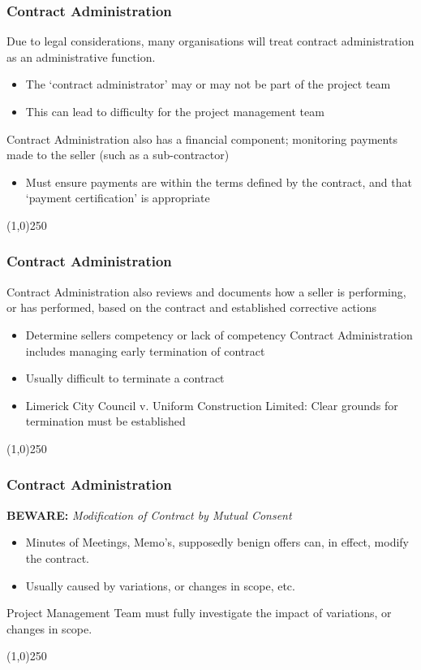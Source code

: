 \begin{frame}
\frametitle{Contract Administration}
Due to legal considerations, many organisations will treat contract administration as an administrative function.\\
\begin{itemize}
	\item The `contract administrator' may or may not be part of the project team
	\item This can lead to difficulty for the project management team
\end{itemize}
Contract Administration also has a financial component; monitoring payments made to the seller (such as a sub-contractor)
\begin{itemize}
	\item Must ensure payments are within the terms defined by the contract, and that `payment certification' is appropriate
\end{itemize}
\end{frame}\begin{center}\line(1,0){250}\end{center}



\begin{frame}
\frametitle{Contract Administration}
Contract Administration also reviews and documents how a seller is performing, or has performed, based on the contract and established corrective actions
\begin{itemize}
	\item Determine sellers competency or lack of competency
Contract Administration includes managing early termination of contract
	\item Usually difficult to terminate a contract
	\item Limerick City Council v. Uniform Construction Limited: Clear grounds for termination must be established 
\end{itemize}
\end{frame}\begin{center}\line(1,0){250}\end{center}



\begin{frame}
\frametitle{Contract Administration}
\textbf{BEWARE:}
\textit{Modification of Contract by Mutual Consent}
\begin{itemize}
	\item Minutes of Meetings, Memo's, supposedly benign offers can, in effect, modify the contract.
	\item Usually caused by variations, or changes in scope, etc.
\end{itemize}
Project Management Team must fully investigate the impact of variations, or changes in scope. 
\end{frame}\begin{center}\line(1,0){250}\end{center}



